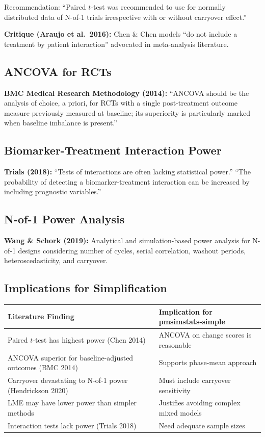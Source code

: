 \documentclass[11pt]{article}
\begin{document}
Recommendation: ``Paired $t$-test was recommended to use for normally
distributed data of N-of-1 trials irrespective with or without
carryover effect.''

\textbf{Critique (Araujo et al.\ 2016):} Chen \& Chen models ``do not
include a treatment by patient interaction'' advocated in meta-analysis
literature.

\subsection{ANCOVA for RCTs}

\textbf{BMC Medical Research Methodology (2014):} ``ANCOVA should be the
analysis of choice, a priori, for RCTs with a single post-treatment
outcome measure previously measured at baseline; its superiority is
particularly marked when baseline imbalance is present.''

\subsection{Biomarker-Treatment Interaction Power}

\textbf{Trials (2018):} ``Tests of interactions are often lacking
statistical power.'' ``The probability of detecting a biomarker-treatment
interaction can be increased by including prognostic variables.''

\subsection{N-of-1 Power Analysis}

\textbf{Wang \& Schork (2019):} Analytical and simulation-based power
analysis for N-of-1 designs considering number of cycles, serial
correlation, washout periods, heteroscedasticity, and carryover.

\subsection{Implications for Simplification}

\begin{table}[h]
\centering\small
\begin{tabular}{@{}L{6.5cm}L{7cm}@{}}
\toprule
Literature Finding & Implication for pmsimstats-simple \\
\midrule
Paired $t$-test has highest power (Chen 2014) & ANCOVA on change scores is reasonable \\
ANCOVA superior for baseline-adjusted outcomes (BMC 2014) & Supports phase-mean approach \\
Carryover devastating to N-of-1 power (Hendrickson 2020) & Must include carryover sensitivity \\
LME may have lower power than simpler methods & Justifies avoiding complex mixed models \\
Interaction tests lack power (Trials 2018) & Need adequate sample sizes \\
\bottomrule
\end{tabular}
\end{table}
\end{document}
